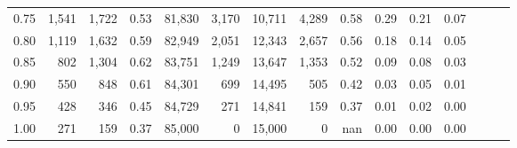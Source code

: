\begin{tabular}{rrrrrrrrrrrrrrr}
0.75 &  1,541 &  1,722 &  0.53 &  81,830 &   3,170 &  10,711 &   4,289 &  0.58 &  0.29 &  0.21 &      0.07 \\
0.80 &  1,119 &  1,632 &  0.59 &  82,949 &   2,051 &  12,343 &   2,657 &  0.56 &  0.18 &  0.14 &      0.05 \\
0.85 &    802 &  1,304 &  0.62 &  83,751 &   1,249 &  13,647 &   1,353 &  0.52 &  0.09 &  0.08 &      0.03 \\
0.90 &    550 &    848 &  0.61 &  84,301 &     699 &  14,495 &     505 &  0.42 &  0.03 &  0.05 &      0.01 \\
0.95 &    428 &    346 &  0.45 &  84,729 &     271 &  14,841 &     159 &  0.37 &  0.01 &  0.02 &      0.00 \\
1.00 &    271 &    159 &  0.37 &  85,000 &       0 &  15,000 &       0 &   nan &  0.00 &  0.00 &      0.00 \\
\bottomrule
\end{tabular}

